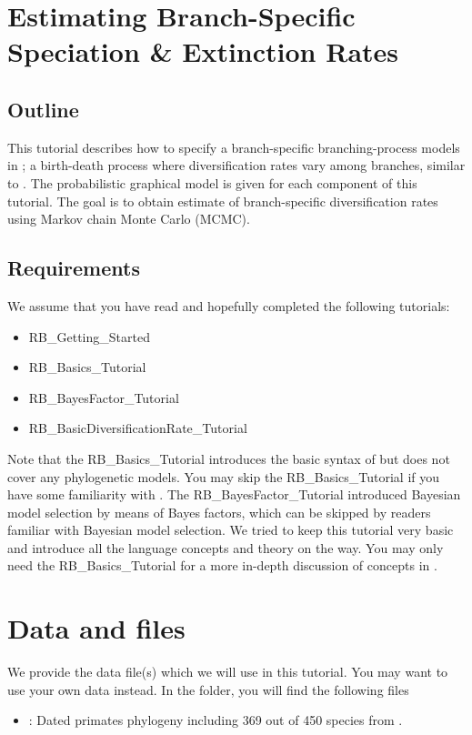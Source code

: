 \section{Estimating Branch-Specific Speciation \& Extinction Rates}

\subsection{Outline}

This tutorial describes how to specify a branch-specific branching-process models in \RevBayes;
a birth-death process where diversification rates vary among branches, similar to \citep{Rabosky2014a}.
The probabilistic graphical model is given for each component of this tutorial.
The goal is to obtain estimate of branch-specific diversification rates using Markov chain Monte Carlo (MCMC).


\subsection{Requirements}
We assume that you have read and hopefully completed the following tutorials:
\begin{itemize}
\item RB\_Getting\_Started
\item RB\_Basics\_Tutorial
\item RB\_BayesFactor\_Tutorial
\item RB\_BasicDiversificationRate\_Tutorial
\end{itemize}
Note that the RB\_Basics\_Tutorial introduces the basic syntax of \Rev but does not cover any phylogenetic models.
You may skip the RB\_Basics\_Tutorial if you have some familiarity with \R.
The RB\_BayesFactor\_Tutorial introduced Bayesian model selection by means of Bayes factors, which can be skipped by readers familiar with Bayesian model selection.
We tried to keep this tutorial very basic and introduce all the language concepts and theory on the way.
You may only need the RB\_Basics\_Tutorial for a more in-depth discussion of concepts in \Rev.


\section{Data and files}

We provide the data file(s) which we will use in this tutorial.
You may want to use your own data instead.
In the  folder, you will find the following files
\begin{itemize}
\item {}: Dated primates phylogeny including 369 out of 450 species from \cite{Springer2012}.
\end{itemize}


